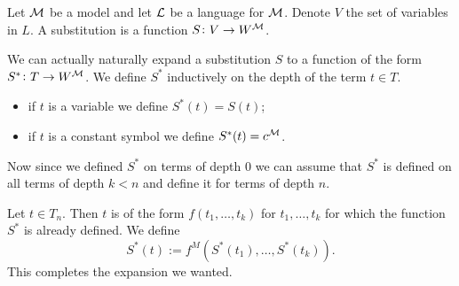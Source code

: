 \documentclass[11pt,a4paper]{article}
\begin{document}
  \begin{definition}[Substitution]
    Let $\mathcal{M}$ be a model and let $\mathcal{L}$ be a language for $\mathcal{M}$.
    Denote $V$ the set of variables in $L$.
    A substitution is a function $S \colon V \to W^{\mathcal{M}}$.
  \end{definition}

  We can actually naturally expand a substitution $S$ to a function of
  the form $S^* \colon T \to W^{\mathcal{M}}$.
  We define $S^*$ inductively on the depth of the term $t \in T$.
  \begin{itemize}
    \item if $t$ is a variable we define $S^*(t) = S(t)$;
    \item if $t$ is a constant symbol we define $S^*(t) = c^{\mathcal{M}}$.
  \end{itemize}
  Now since we defined $S^*$ on terms of depth $0$ we can assume that $S^*$
  is defined on all terms of depth $k < n$ and define it for terms of depth
  $n$.

  Let $t \in T_n$. Then $t$ is of the form $f(t_1,\dots,t_k)$ for
  $t_1,\dots,t_k$ for which the function $S^*$ is already defined.
  We define
  \[
    S^*(t) := f^M(S^*(t_1),\dots,S^*(t_k)).
  \]
  This completes the expansion we wanted.
\end{document}
